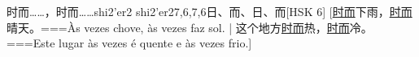 \begin{EntryWithPhonetic}{时而……，时而……}{shi2'er2 shi2'er2}{7,6,7,6}{⽇、⽽、⽇、⽽}[HSK 6]
  [\underline{时而}下雨，\underline{时而}晴天。===Às vezes chove, às vezes faz sol. | 这个地方\underline{时而}热，\underline{时而}冷。===Este lugar às vezes é quente e às vezes frio.]
\end{EntryWithPhonetic}

